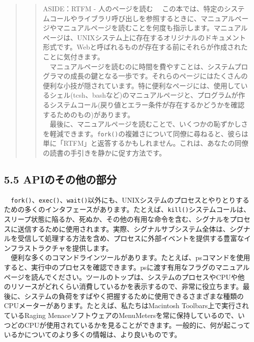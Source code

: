 \begin{quote}
\begin{quote}
ASIDE：RTFM - 人のページを読む
　この本では、特定のシステムコールやライブラリ呼び出しを参照するときに、マニュアルページやマニュアルページを読むことを何度も指示します。マニュアルページは、UNIXシステム上に存在するオリジナルのドキュメント形式です。Webと呼ばれるものが存在する前にそれらが作成されたことに気付きます。\\
　マニュアルページを読むのに時間を費やすことは、システムプログラマの成長の鍵となる一歩です。それらのページにはたくさんの便利な小技が隠されています。特に便利なページには、使用しているシェル(tcsh、bashなど)のマニュアルページと、プログラムが作るシステムコール(戻り値とエラー条件が存在するかどうかを確認するためのもの)があります。\\
　最後に、マニュアルページを読むことで、いくつかの恥ずかしさを軽減できます。\texttt{fork()}の複雑さについて同僚に尋ねると、彼らは単に「RTFM」と返答するかもしれません。これは、あなたの同僚の読書の手引きを静かに促す方法です。
\end{quote}
\end{quote}

\hypertarget{apiux306eux305dux306eux4ed6ux306eux90e8ux5206}{%
\subsection*{5.5
APIのその他の部分}\label{apiux306eux305dux306eux4ed6ux306eux90e8ux5206}}

　\texttt{fork()}、\texttt{exec()}、\texttt{wait()}以外にも、UNIXシステムのプロセスとやりとりするための多くのインタフェースがあります。たとえば、\texttt{kill()}システムコールは、スリープ状態に陥るか、死ぬか、その他の有用な命令を含む、シグナルをプロセスに送信するために使用されます。実際、シグナルサブシステム全体は、シグナルを受信して処理する方法を含め、プロセスに外部イベントを提供する豊富なインフラストラクチャを提供します。\\
　便利な多くのコマンドラインツールがあります。たとえば、psコマンドを使用すると、実行中のプロセスを確認できます。psに渡す有用なフラグのマニュアルページを読んでください。ツールのトップは、システムのプロセスやCPUや他のリソースがどれくらい消費しているかを表示するので、非常に役立ちます。最後に、システムの負荷をすばやく把握するために使用できるさまざまな種類のCPUメーターがあります。たとえば、私たちはMacintosh
Toolbars上で実行されているRaging
MenaceソフトウェアのMenuMetersを常に保持しているので、いつどのCPUが使用されているかを見ることができます。一般的に、何が起こっているかについてのより多くの情報は、より良いものです。

